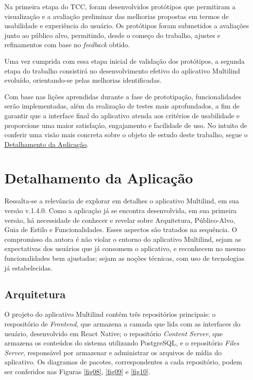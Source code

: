 Na primeira etapa do TCC, foram desenvolvidos protótipos que permitiram a visualização e a avaliação preliminar das melhorias propostas em termos de usabilidade e experiência do usuário. Os protótipos 
foram submetidos a avaliações junto ao público alvo, permitindo, desde o começo do trabalho, ajustes e refinamentos com base no \textit{feedback} obtido. 

Uma vez cumprida com essa etapa inicial de validação dos protótipos, a segunda etapa do trabalho consistirá no desenvolvimento efetivo do aplicativo Multilind evoluído, orientando-se pelas melhorias identificadas. 

Com base nas lições aprendidas durante a fase de prototipação, funcionalidades serão implementadas, além da realização de testes mais aprofundados, a fim de garantir que a interface final do aplicativo atenda aos critérios de usabilidade e proporcione uma maior satisfação, engajamento e facilidade de uso. No intuito de conferir uma visão 
mais concreta sobre o objeto de estudo deste trabalho, segue o \hyperref[sec:Detalhamento da Aplicacao]{Detalhamento da Aplicação}.
	
\section{Detalhamento da Aplicação}
\label{sec:Detalhamento da Aplicacao}
Ressalta-se a relevância de explorar em detalhes o aplicativo Multilind, em sua versão v.1.4.0. Como a aplicação já se encontra desenvolvida, em sua primeira versão, há necessidade de conhecer e revelar sobre Arquitetura, Público-Alvo, Guia de Estilo e Funcionalidades. Esses aspectos são 
tratados na sequência. O compromisso da autora é não violar o entorno do aplicativo Multilind, sejam as expectativas dos usuários que já consomem o aplicativo, e reconhecem no mesmo funcionalidades bem ajustadas; sejam as noções técnicas, com uso de tecnologias já estabelecidas.

\subsection{Arquitetura}
\label{Arquitetura}
O projeto do aplicativo Multilind contém três repositórios principais: o respositório de \textit{Frontend}, que armazena a camada que lida com as interfaces do usuário, desenvolvido em React Native; o repositório \textit{Content Server}, que armazena os conteúdos do sistema 
utilizando PostgreSQL, e o repositório \textit{Files Server}, responsável por armazenar e administrar os arquivos de mídia do aplicativo. Os diagramas de  pacotes, correspondentes a cada repositório, podem ser conferidos nas Figuras \ref{fig08}, \ref{fig09} e \ref{fig10}. 

